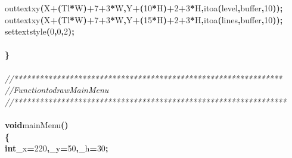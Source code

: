 \documentclass[a4paper, 10pt]{article}
\newcommand\SPC{\hspace*{0.6em}}
\newcommand{\CppAComment}[1]{\textit{\textcolor[rgb]{0.2,0.6,1}{#1}}}
\newcommand{\CppAIdentifier}[1]{#1}
\newcommand{\CppANumber}[1]{\textcolor[rgb]{0.5,0,0.5}{#1}}
\newcommand{\CppAReservedWord}[1]{\textbf{#1}}
\newcommand{\CppASpace}[1]{\colorbox[rgb]{1,1,1}{#1}}
\newcommand{\CppASymbol}[1]{\textbf{\textcolor[rgb]{1,0,0}{#1}}}
\begin{document}
\begin{ttfamily}
\CppASpace{\SPC \SPC \SPC \SPC \SPC \SPC \SPC }\CppAIdentifier{outtextxy}\CppASymbol{(}\CppAIdentifier{X}\CppASymbol{+}\CppASymbol{(}\CppAIdentifier{Tl}\CppASymbol{*}\CppAIdentifier{W}\CppASymbol{)}\CppASymbol{+}\CppANumber{7}\CppASymbol{+}\CppANumber{3}\CppASymbol{*}\CppAIdentifier{W}\CppASymbol{,}\CppAIdentifier{Y}\CppASymbol{+}\CppASymbol{(}\CppANumber{10}\CppASymbol{*}\CppAIdentifier{H}\CppASymbol{)}\CppASymbol{+}\CppANumber{2}\CppASymbol{+}\CppANumber{3}\CppASymbol{*}\CppAIdentifier{H}\CppASymbol{,}\CppAIdentifier{itoa}\CppASymbol{(}\CppAIdentifier{level}\CppASymbol{,}\CppAIdentifier{buffer}\CppASymbol{,}\CppANumber{10}\CppASymbol{)}\CppASymbol{)}\CppASymbol{;}\\
\CppASpace{\SPC \SPC \SPC \SPC \SPC \SPC \SPC }\CppAIdentifier{outtextxy}\CppASymbol{(}\CppAIdentifier{X}\CppASymbol{+}\CppASymbol{(}\CppAIdentifier{Tl}\CppASymbol{*}\CppAIdentifier{W}\CppASymbol{)}\CppASymbol{+}\CppANumber{7}\CppASymbol{+}\CppANumber{3}\CppASymbol{*}\CppAIdentifier{W}\CppASymbol{,}\CppAIdentifier{Y}\CppASymbol{+}\CppASymbol{(}\CppANumber{15}\CppASymbol{*}\CppAIdentifier{H}\CppASymbol{)}\CppASymbol{+}\CppANumber{2}\CppASymbol{+}\CppANumber{3}\CppASymbol{*}\CppAIdentifier{H}\CppASymbol{,}\CppAIdentifier{itoa}\CppASymbol{(}\CppAIdentifier{lines}\CppASymbol{,}\CppAIdentifier{buffer}\CppASymbol{,}\CppANumber{10}\CppASymbol{)}\CppASymbol{)}\CppASymbol{;}\\
\CppASpace{\SPC \SPC \SPC \SPC \SPC \SPC \SPC }\CppAIdentifier{settextstyle}\CppASymbol{(}\CppANumber{0}\CppASymbol{,}\CppANumber{0}\CppASymbol{,}\CppANumber{2}\CppASymbol{)}\CppASymbol{;}\\
\\
\CppASymbol{\}}\\
\\
\CppAComment{//***************************************************************}\\
\CppAComment{//\SPC \SPC \SPC Function\SPC to\SPC draw\SPC Main\SPC Menu}\\
\CppAComment{//****************************************************************}\\
\\
\CppAReservedWord{void}\CppASpace{\SPC }\CppAIdentifier{mainMenu}\CppASymbol{(}\CppASymbol{)}\\
\CppASymbol{\{}\\
\CppASpace{\SPC }\CppAReservedWord{int}\CppASpace{\SPC }\CppAIdentifier{\_x}\CppASymbol{=}\CppANumber{220}\CppASymbol{,}\CppAIdentifier{\_y}\CppASymbol{=}\CppANumber{50}\CppASymbol{,}\CppAIdentifier{\_h}\CppASymbol{=}\CppANumber{30}\CppASymbol{;}\\

\end{ttfamily}
\end{document}
